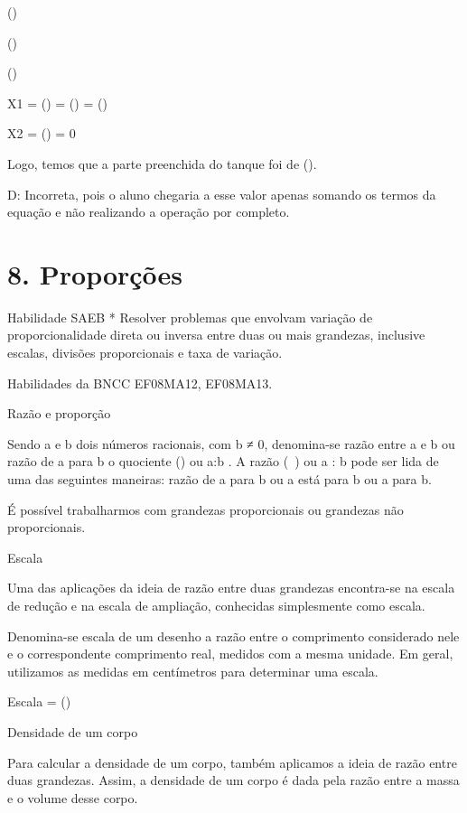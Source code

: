 {()

()

()

X1 = () = () = ()

X2 = () = 0

Logo, temos que a parte preenchida do tanque foi de ().

D: Incorreta, pois o aluno chegaria a esse valor apenas somando os
termos da equação e não realizando a operação por completo.


\section{8. Proporções}

Habilidade SAEB * Resolver problemas que envolvam variação de
proporcionalidade direta ou inversa entre duas ou mais grandezas,
inclusive escalas, divisões proporcionais e taxa de variação.

Habilidades da BNCC EF08MA12, EF08MA13.

Razão e proporção

Sendo a e b dois números racionais, com b ≠ 0, denomina-se razão entre a
e b ou razão de a para b o quociente () ou a:b . A razão
(\ ) ou a : b pode ser lida de uma das seguintes maneiras:
razão de a para b ou a está para b ou a para b.

É possível trabalharmos com grandezas proporcionais ou grandezas não
proporcionais.

Escala

Uma das aplicações da ideia de razão entre duas grandezas encontra-se na
escala de redução e na escala de ampliação, conhecidas simplesmente como
escala.

Denomina-se escala de um desenho a razão entre o comprimento considerado
nele e o correspondente comprimento real, medidos com a mesma unidade.
Em geral, utilizamos as medidas em centímetros para determinar uma
escala.

Escala =
()

Densidade de um corpo

Para calcular a densidade de um corpo, também aplicamos a ideia de razão
entre duas grandezas. Assim, a densidade de um corpo é dada pela razão
entre a massa e o volume desse corpo.

}
